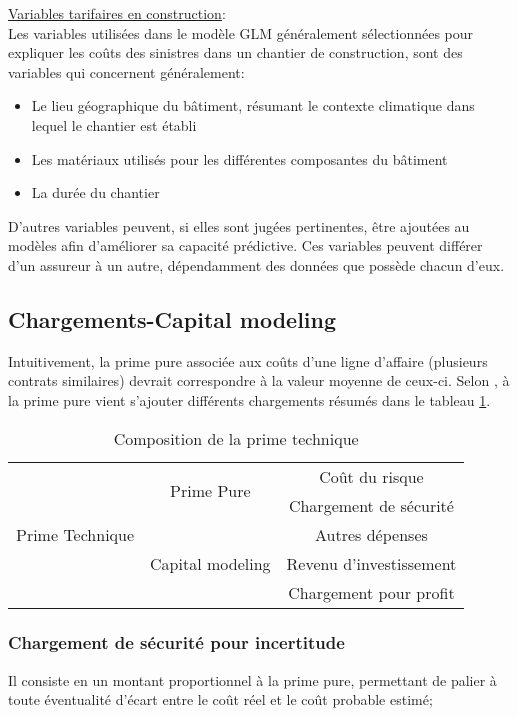 \documentclass[11pt]{article}
\begin{document}
\underline{Variables tarifaires en construction}:\\
Les variables utilisées dans le modèle GLM généralement sélectionnées pour expliquer les coûts des sinistres dans un chantier de construction, sont des variables qui concernent généralement:
\begin{itemize}
\item Le lieu géographique du bâtiment, résumant le contexte climatique dans lequel le chantier est établi
\item Les matériaux utilisés pour les différentes composantes du bâtiment
\item La durée du chantier
\end{itemize}
D'autres variables peuvent, si elles sont jugées pertinentes, être ajoutées au modèles afin d'améliorer sa capacité prédictive. Ces variables peuvent différer d'un assureur à un autre, dépendamment des données que possède chacun d'eux.

\subsection{Chargements-Capital modeling}

Intuitivement, la prime pure associée aux coûts d'une ligne d'affaire (plusieurs contrats similaires) devrait correspondre à la valeur moyenne de ceux-ci. Selon \cite{parodi2014pricing}, à la prime pure vient s’ajouter différents chargements résumés dans le tableau \ref{table_prime}.

\begin{table}
\begin{center}
\begin{tabular}{|c|c|c|}\hline
\multirow{5}{*}{Prime Technique} & \multirow{2}{*}{Prime Pure} & Coût du risque \\ \cline{3-3}
    &  & Chargement de sécurité \\ \cline{2-3}
    & \multirow{3}{*}{Capital modeling} & Autres dépenses \\ \cline{3-3}
    &  & Revenu d’investissement  \\ \cline{3-3}
    &  & Chargement pour profit  \\ \hline
\end{tabular}
\caption{Composition de la prime technique}\label{table_prime}
\end{center}
\end{table}

\subsubsection{Chargement de sécurité pour incertitude}
Il consiste en un montant proportionnel à la prime pure, permettant de palier à toute éventualité d'écart entre le coût réel et le coût probable estimé;\\
\end{document}
